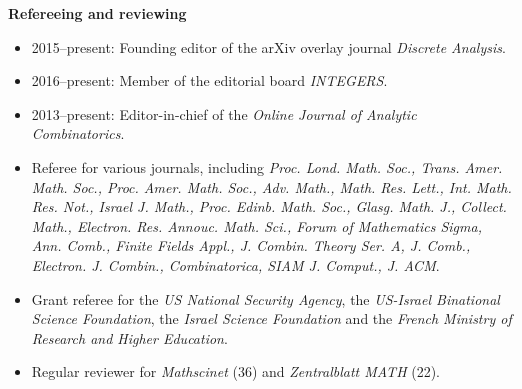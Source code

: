 \documentclass[11pt]{article}
\newenvironment{mitemize}{
\begin{itemize}
  \setlength{\itemsep}{1pt}
  \setlength{\parskip}{0pt}
  \setlength{\parsep}{0pt}
}{\end{itemize}}
\begin{document}
\vspace{3pt}
\textbf{Refereeing and reviewing}
\begin{mitemize}
\item 2015--present: Founding editor of the arXiv overlay journal \textit{Discrete Analysis}.
\item 2016--present: Member of the editorial board \textit{INTEGERS}.
\item 2013--present: Editor-in-chief of the \textit{Online Journal of Analytic Combinatorics}.
\item Referee for various journals, including \textit{Proc. Lond. Math. Soc., Trans. Amer. Math. Soc., Proc. Amer. Math. Soc., Adv. Math., Math. Res. Lett., Int. Math. Res. Not., Israel J. Math., Proc. Edinb. Math. Soc., Glasg. Math. J., Collect. Math., Electron. Res. Annouc. Math. Sci., Forum of Mathematics Sigma, Ann. Comb., Finite Fields Appl., J. Combin. Theory Ser. A, J. Comb., Electron. J. Combin., Combinatorica, SIAM J. Comput., J. ACM}.
\item Grant referee for the \textit{US National Security Agency}, the \textit{US-Israel Binational Science Foundation}, the \textit{Israel Science Foundation} and the \textit{French Ministry of Research and Higher Education}.
\item Regular reviewer for \textit{Mathscinet} (36) and \textit{Zentralblatt MATH} (22).
\end{mitemize}

\end{document}
